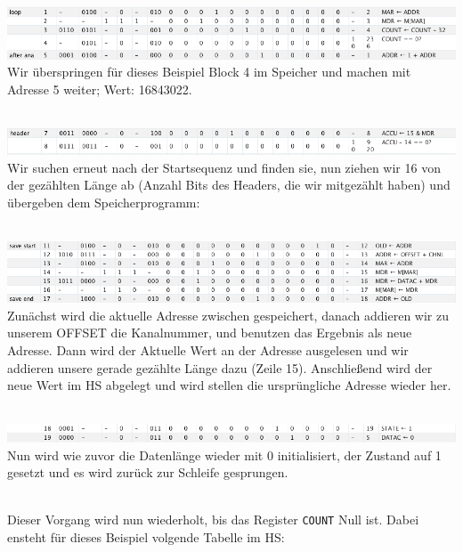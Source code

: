 \documentclass[12pt,titlepage]{article}
\begin{document}
\leavevmode \\
\includegraphics[width=16cm]{listing/row1-5.png}
\leavevmode \\

Wir überspringen für dieses Beispiel Block 4 im Speicher und machen mit Adresse 5 weiter; Wert: 16843022.

\leavevmode \\
\includegraphics[width=16cm]{listing/row7-8.png}
\leavevmode \\

Wir suchen erneut nach der Startsequenz und finden sie, nun ziehen wir 16 von der gezählten Länge ab (Anzahl Bits des Headers, die wir
mitgezählt haben) und übergeben dem Speicherprogramm:

\leavevmode \\
\includegraphics[width=16cm]{listing/row11-17.png}
\leavevmode \\

Zunächst wird die aktuelle Adresse zwischen gespeichert, danach addieren wir zu unserem OFFSET die Kanalnummer, und benutzen das Ergebnis
als neue Adresse. Dann wird der Aktuelle Wert an der Adresse ausgelesen und wir addieren unsere gerade gezählte Länge dazu (Zeile 15).
Anschließend wird der neue Wert im HS abgelegt und wird stellen die ursprüngliche Adresse wieder her.

\leavevmode \\
\includegraphics[width=16cm]{listing/row18-19.png}
\leavevmode \\

Nun wird wie zuvor die Datenlänge wieder mit 0 initialisiert, der Zustand auf 1 gesetzt und es wird zurück zur Schleife gesprungen.

\leavevmode \\

Dieser Vorgang wird nun wiederholt, bis das Register \texttt{COUNT} Null ist. Dabei ensteht für dieses Beispiel volgende Tabelle im HS:
\end{document}
